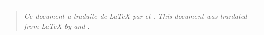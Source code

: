 \rule{}{}
\begin{quote}\em
\iffrench Ce document a traduite de \LaTeX{} par
 et
.
\else
This document was tranlated from \LaTeX{} by
 and
.
\fi
\end{quote}